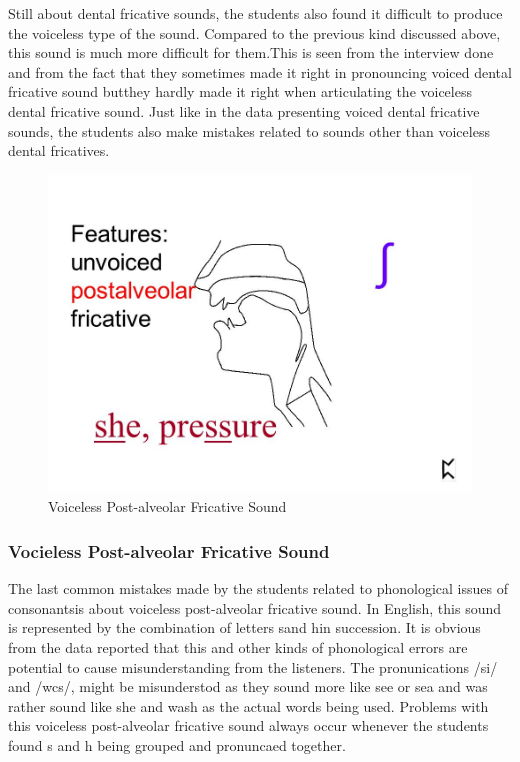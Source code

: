 Still about dental fricative sounds, the students also found it
difficult to produce the voiceless type of the sound. Compared to the
previous kind discussed above, this sound is much more difficult for
them.This is seen from the interview done and from the fact that they
sometimes made it right in pronouncing voiced dental fricative sound
butthey hardly made it right when articulating the voiceless dental
fricative sound. Just like in the data presenting voiced dental
fricative sounds, the students also make mistakes related to sounds
other than voiceless dental fricatives.

\begin{figure}[h!]
	\centering
	\includegraphics[scale=0.25]{img/post_alveolar.jpg}
	\caption{Voiceless Post-alveolar Fricative Sound}
	\label{fig:world}
\end{figure}
\subsubsection{Vocieless Post-alveolar Fricative
Sound}

The last common mistakes made by the students related to phonological
issues of consonantsis about voiceless post-alveolar fricative sound. In
English, this sound is represented by the combination of letters sand
hin succession. It is obvious from the data reported that this and other
kinds of phonological errors are potential to cause misunderstanding
from the listeners. The pronunications /si/ and /wcs/, might be
misunderstod as they sound more like see or sea and was rather sound
like she and wash as the actual words being used. Problems with this
voiceless post-alveolar fricative sound always occur whenever the
students found s and h being grouped and pronuncaed together.




